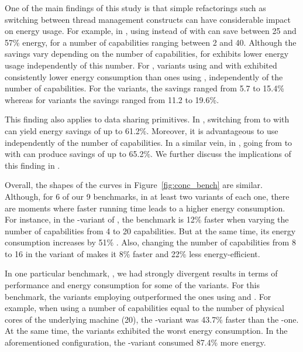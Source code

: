  One of the main findings of this study is that simple refactorings such as switching between thread management constructs can have considerable impact on energy usage. For example, in \spectral, using \forkOn instead of \forkOS with \TVar can save between 25 and 57\% energy, for a number of capabilities ranging between 2 and 40. Although the savings vary depending on the number of capabilities, for \spectral \forkOn exhibits lower energy usage independently of this number. For \mandelbrot, variants using \forkOS and \forkOn with \MVar exhibited consistently lower energy consumption than ones using \forkIO, independently of the number of capabilities. For the \forkOS variants, the savings ranged from 5.7 to 15.4\% whereas for \forkOn variants the savings ranged from 11.2 to 19.6\%.

This finding also applies to data sharing primitives. In \chameneos, switching from \TMVar to \MVar with \forkOn can yield energy savings of up to 61.2\%. Moreover, it is advantageous to use \MVar independently of the number of capabilities. In a similar vein, in \fasta, going from \TVar to \MVar with \forkIO can produce savings of up to 65.2\%. We further discuss the implications of this finding in .
\newline

 Overall, the shapes of the curves in Figure~\ref{fig:conc_bench} are similar. Although, for 6 of our 9 benchmarks, in at least two variants of each one, there are moments where faster running time leads to a higher energy consumption. For instance, in the \forkOn-\TMVar variant of \regex, the benchmark is 12\% faster when varying the number of capabilities from 4 to 20 capabilities. But at the same time, its energy consumption increases by 51\% . Also, changing the number of capabilities from 8 to 16 in the \forkIO variant of \tsearch makes it 8\% faster and 22\% less energy-efficient.

In one particular benchmark, \fasta, we had strongly divergent results in terms of performance and energy consumption for some of the variants. For this benchmark, the variants  employing \TVar outperformed the ones using \TMVar and \MVar. For example, when using a number of capabilities equal to the number of physical cores of the underlying machine (20), the \forkOS-\TVar variant was 43.7\% faster than the \forkOS-\MVar one. At the same time, the \TVar variants exhibited the worst energy consumption. In the aforementioned configuration, the \forkOS-\TVar variant consumed 87.4\% more energy.
\newline

